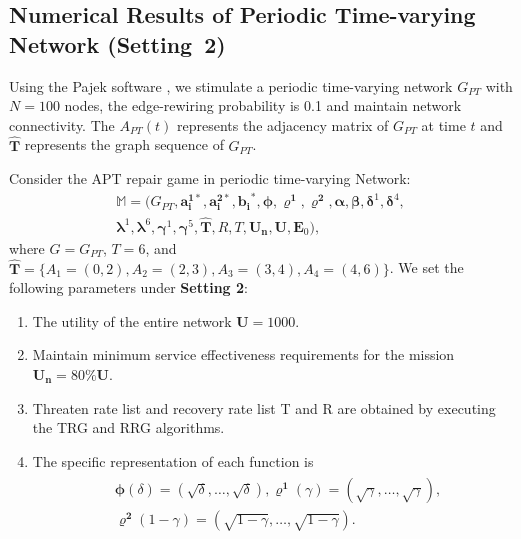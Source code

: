\documentclass[lettersize,journal]{IEEEtran}
\begin{document}
\subsection{Numerical Results of Periodic Time-varying Network (Setting~2)}\label{periodic network}
Using the Pajek software \cite{de2018exploratory}, we stimulate a periodic time-varying network $G_{PT}$ with $N = 100$ nodes, the edge-rewiring probability is 0.1 and maintain network connectivity. The $A_{PT}(t)$ represents the adjacency matrix of $G_{PT}$ at time $t$ and $\bm{\hat{T}}$ represents the graph sequence of $G_{PT}$.\par
   Consider the APT repair game in periodic time-varying Network:
   \begin{equation}
	\begin{aligned}
	\mathbb{M}=(G_{PT},\bm{a^{1*}_i},\bm{a^{2*}_i},\bm{b_i}^*,\bm{\phi},\bm{\varrho^1},\bm{\varrho^2},\bm{\alpha},\bm{\beta},\bm{\delta}^1,\bm{\delta}^4,\\
\bm{\lambda}^1,\bm{\lambda}^6,\bm{\gamma}^1,\bm{\gamma}^5,\bm{\hat{T}},
R,T,\bm{U_n},\bm{U},\bm{E}_0),\nonumber
	\end{aligned}
	\end{equation}
  where $G=G_{PT}$, $T = 6$, and
 $\bm{\hat{T}}=\{A_1=(0,2),A_2=(2,3),A_3=(3,4),A_4=(4,6)\}$. We set the following parameters under \textbf{Setting 2}:
 \begin{enumerate}
	\item The utility of the entire network $\bm{U}=1000$.
	\item Maintain minimum service effectiveness requirements for the mission $\bm{U_n} = 80\% \bm{U}$.
	\item Threaten rate list and recovery rate list T and R are obtained by executing the TRG and RRG algorithms.
	\item The specific representation of each function is
        \begin{equation}
        \begin{aligned}
        \begin{aligned}
        &\boldsymbol{\phi}(\delta) =(\sqrt{\delta}, \ldots, \sqrt{\delta}),  \boldsymbol{\varrho^1}(\gamma) =\left(\sqrt{\gamma}, \ldots, \sqrt{\gamma}\right),
        \\
        &\boldsymbol{\varrho^2}(1-\gamma) =(\sqrt{1-\gamma}, \ldots, \sqrt{1-\gamma}).
        \end{aligned}\nonumber
    	\end{aligned}
    	\end{equation}
\end{enumerate}
\par
\end{document}
